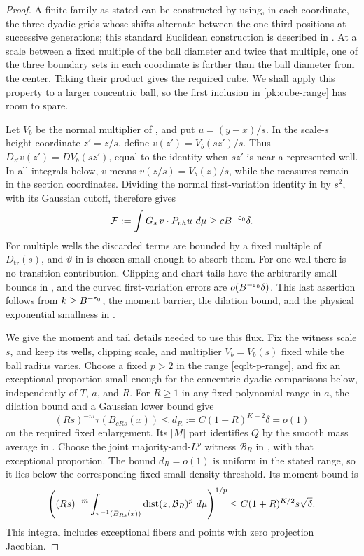 \begin{proof}
A finite family as stated can be constructed by using, in each
coordinate, the three dyadic grids whose shifts alternate between
the one-third positions at successive generations; this standard
Euclidean construction is described in \cite[p.~2]{HytonenKairema2012}.
At a scale
between a fixed multiple of the ball diameter and twice that
multiple, one of the three boundary sets in each coordinate is
farther than the ball diameter from the center.  Taking their
product gives the required cube.  We shall apply this property
to a larger concentric ball, so the first inclusion in
\eqref{pk:cube-range} has room to spare.

Let $V_b$ be the normal multiplier of , and put
$u=(y-x)/s$. In the scale-$s$ height coordinate $z'=z/s$, define
$v(z')=V_b(sz')/s$. Thus $D_{z'}v(z')=DV_b(sz')$, equal to the
identity when $sz'$ is near a represented well. In all integrals below,
$v$ means $v(z/s)=V_b(z)/s$, while the measures remain in the section
coordinates. Dividing the normal first-variation identity in
 by $s^2$, with its Gaussian cutoff, therefore gives
\begin{equation}\label{pk:flux-lower}
 \mathcal F:=\int G_s\,v\cdot P_{vh}u\,\mathop{}\!d\mu
 \ge c B^{-\varepsilon_0}\delta.
\end{equation}
For multiple wells the discarded terms are bounded by a fixed
multiple of $D_{\mathrm{tr}}(s)$, and $\vartheta$ in
 is chosen small enough to absorb them.
For one well there is no transition contribution.  Clipping and
chart tails have the arbitrarily small bounds in
, and the curved first-variation errors are
$o(B^{-\varepsilon_0}\delta)$.  This last assertion follows from
$k\ge B^{-\varepsilon_0}$, the moment barrier, the dilation bound,
and the physical exponential smallness in .

We give the moment and tail details needed to use this flux. Fix the
witness scale $s$, and keep its wells, clipping scale, and multiplier
$V_b=V_b(s)$ fixed while the ball radius varies. Choose a fixed $p>2$
in the range \eqref{eq:lt-p-range}, and fix an exceptional proportion
small enough for the concentric dyadic comparisons below, independently
of $T$, $a$, and $R$. For $R\ge1$ in any fixed polynomial range in $a$,
the dilation bound and a Gaussian lower bound give
\[
 (Rs)^{-m}\tau(B_{cRs}(x))
 \le d_R:=C(1+R)^{K-2}\delta=o(1)
\]
on the required fixed enlargement. Its $|M|$ part identifies $Q$ by
the smooth mass average in . Choose the joint
majority-and-$L^p$ witness $\mathcal B_R$ in , with
that exceptional proportion. The bound $d_R=o(1)$ is uniform in
the stated range, so it lies below the corresponding fixed
small-density threshold. Its moment bound is
\[
 \left((Rs)^{-m}\int_{\pi^{-1}(B_{Rs}(x))}
       \operatorname{dist}(z,\mathcal B_R)^p\,\mathop{}\!d\mu\right)^{1/p}
 \le C(1+R)^{K/2}s\sqrt\delta.
\]
This integral includes exceptional fibers and points with zero
projection Jacobian.


\end{proof}
